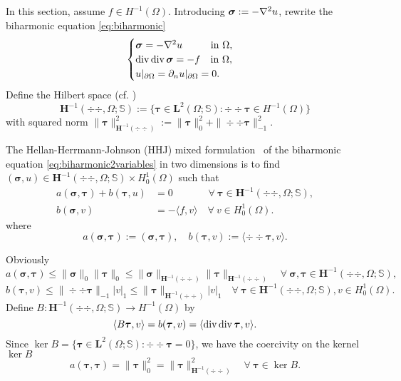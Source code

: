 In this section, assume $f\in H^{-1}(\Omega)$.
Introducing $\boldsymbol\sigma:=-\nabla^2 u$, rewrite the biharmonic equation \eqref{eq:biharmonic}
\begin{equation}\label{eq:biharmonic2variables}
\begin{cases}
\boldsymbol\sigma =-\nabla^2 u\qquad\;\;\; \textrm{in }\Omega, \\
\operatorname{div}\operatorname{div}\boldsymbol\sigma=-f\quad \textrm{in }\Omega, \\
u|_{\partial\Omega}=\partial_{n}u|_{\partial\Omega}=0.
\end{cases}
\end{equation}
Define the Hilbert space (cf. \cite{PechsteinSchoberl2011})
\[
\boldsymbol{H}^{-1}(\div{\div },\Omega; \mathbb{S}):=\{\boldsymbol{\tau}\in \boldsymbol{L}^{2}(\Omega; \mathbb{S}): \div \div\boldsymbol{\tau}\in H^{-1}(\Omega)\}
\]
with squared norm $
\|\boldsymbol{\tau}\|_{\boldsymbol{H}^{-1}(\div\div)}^2:=\|\boldsymbol{\tau}\|_{0}^2+\|\div \div\boldsymbol{\tau}\|_{-1}^2
$.

The Hellan-Herrmann-Johnson (HHJ) mixed formulation~\cite{KrendlRafetsederZulehner2016,Hellan1967,Herrmann1967,Johnson1973} of the biharmonic equation \eqref{eq:biharmonic2variables} in two dimensions is to find $(\boldsymbol{\sigma} , u)\in \boldsymbol{H}^{-1}(\div\div,\Omega; \mathbb{S})\times H_0^1(\Omega)$ such that
\begin{align}
a(\boldsymbol\sigma, \boldsymbol\tau)+ b(\boldsymbol\tau, u) & =0 \quad\quad\quad\;\; \forall~\boldsymbol\tau\in\boldsymbol{H}^{-1}(\div\div,\Omega; \mathbb{S}), \label{eq:hhjmixedformulation1}\\
b(\boldsymbol\sigma, v) & =-\langle f, v\rangle  \quad \forall~v\in H_0^1(\Omega). \label{eq:hhjmixedformulation2}
\end{align}
where
\[
a(\boldsymbol\sigma, \boldsymbol\tau):=(\boldsymbol\sigma, \boldsymbol\tau),\quad b(\boldsymbol\tau, v):=\langle \div\div\boldsymbol\tau, v\rangle.
\]

Obviously
\[
a(\boldsymbol\sigma, \boldsymbol\tau)\leq\|\boldsymbol\sigma\|_0\|\boldsymbol\tau\|_0\leq\|\boldsymbol\sigma\|_{\boldsymbol{H}^{-1}(\div\div)}\|\boldsymbol\tau\|_{\boldsymbol{H}^{-1}(\div\div)} \quad\forall~\boldsymbol\sigma, \boldsymbol\tau\in \boldsymbol{H}^{-1}(\div\div,\Omega; \mathbb{S}),
\]
\[
b(\boldsymbol\tau, v)\leq\|\div\div\boldsymbol\tau\|_{-1}|v|_1\leq \|\boldsymbol\tau\|_{\boldsymbol{H}^{-1}(\div\div)}|v|_1 \quad\forall~\boldsymbol\tau\in \boldsymbol{H}^{-1}(\div\div,\Omega; \mathbb{S}), v\in H_0^1(\Omega).
\]
Define $B: \boldsymbol{H}^{-1}(\div\div,\Omega; \mathbb{S})\to H^{-1}(\Omega)$ by
\[
\langle B\boldsymbol\tau, v\rangle=b(\boldsymbol\tau, v)=\langle \operatorname{div}\operatorname{div}\boldsymbol\tau, v\rangle.
\]
Since $\ker B=\{\boldsymbol{\tau}\in \boldsymbol{L}^{2}(\Omega; \mathbb{S}): \div\div\boldsymbol{\tau}=0\}$, we have the coercivity on the kernel $\ker B$
\[
a(\boldsymbol\tau, \boldsymbol\tau)=\|\boldsymbol\tau\|_0^2=\|\boldsymbol\tau\|_{\boldsymbol{H}^{-1}(\div\div)}^2\quad\forall~\boldsymbol\tau\in\ker B.
\]

